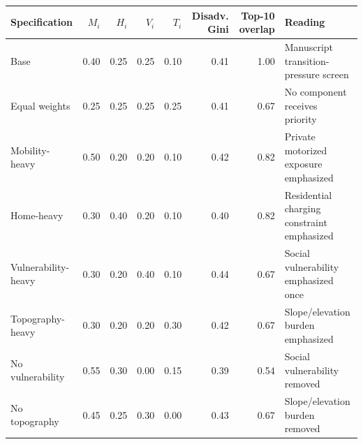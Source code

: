 \begin{tabular}{lrrrrrrp{}}
\toprule
Specification & $M_i$ & $H_i$ & $V_i$ & $T_i$ & Disadv. Gini & Top-10 overlap & Reading \\
\midrule
Base & 0.40 & 0.25 & 0.25 & 0.10 & 0.41 & 1.00 & Manuscript transition-pressure screen \\
Equal weights & 0.25 & 0.25 & 0.25 & 0.25 & 0.41 & 0.67 & No component receives priority \\
Mobility-heavy & 0.50 & 0.20 & 0.20 & 0.10 & 0.42 & 0.82 & Private motorized exposure emphasized \\
Home-heavy & 0.30 & 0.40 & 0.20 & 0.10 & 0.40 & 0.82 & Residential charging constraint emphasized \\
Vulnerability-heavy & 0.30 & 0.20 & 0.40 & 0.10 & 0.44 & 0.67 & Social vulnerability emphasized once \\
Topography-heavy & 0.30 & 0.20 & 0.20 & 0.30 & 0.42 & 0.67 & Slope/elevation burden emphasized \\
No vulnerability & 0.55 & 0.30 & 0.00 & 0.15 & 0.39 & 0.54 & Social vulnerability removed \\
No topography & 0.45 & 0.25 & 0.30 & 0.00 & 0.43 & 0.67 & Slope/elevation burden removed \\
\bottomrule
\end{tabular}
